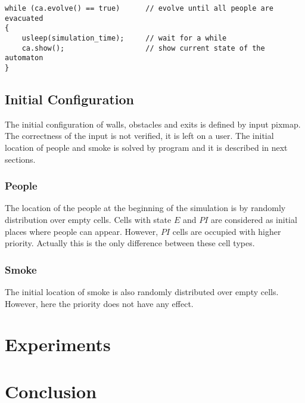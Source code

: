 \bigskip
\begin{lstlisting}
while (ca.evolve() == true)      // evolve until all people are evacuated
{
    usleep(simulation_time);     // wait for a while
    ca.show();                   // show current state of the automaton
}
\end{lstlisting}

\subsection{Initial Configuration}
The initial configuration of walls, obstacles and exits is defined by input
pixmap. The correctness  of the input is not verified, it is left on a user.
The initial location of people and smoke is solved by program and it is
described in next sections.

\subsubsection{People}
The location of the people at the beginning of the simulation is by randomly
distribution over empty cells. Cells with state $E$ and $PI$ are considered as
initial places where people can appear. However, $PI$ cells are occupied with
higher priority. Actually this is the only difference between these cell types.

\subsubsection{Smoke}
The initial location of smoke is also randomly distributed over empty cells.
However, here the priority does not have any effect.


\section{Experiments}

\section{Conclusion}